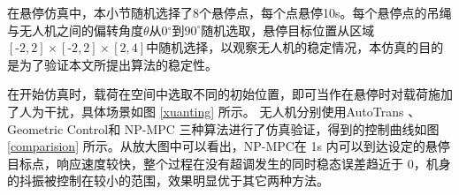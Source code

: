 \documentclass[lang=chs, degree=master, blindreview=true, winfonts=true]{yanputhesis}
\begin{document}
在悬停仿真中，本小节随机选择了8个悬停点，每个点悬停10s。每个悬停点的吊绳与无人机之间的偏转角度$\theta$从0$^\circ$到$\text{90}^\circ$随机选取，悬停目标位置从区域$[\text{-2}, \text{2}] \times [\text{-2}, \text{2}] \times [\text{2}, \text{4}]$中随机选择，以观察无人机的稳定情况，本仿真的目的是为了验证本文所提出算法的稳定性。



在开始仿真时，载荷在空间中选取不同的初始位置，即可当作在悬停时对载荷施加了人为干扰，具体场景如图 \ref{xuanting} 所示。
无人机分别使用AutoTrans \cite{li2023autotrans}、Geometric Control\cite{sreenath2013geometric}和 NP-MPC 三种算法进行了仿真验证，得到的控制曲线如图 \ref{comparision} 所示。从放大图中可以看出，NP-MPC在 1s 内可以到达设定的悬停目标点，响应速度较快，整个过程在没有超调发生的同时稳态误差趋近于 0，机身的抖振被控制在较小的范围，效果明显优于其它两种方法。
\end{document}
